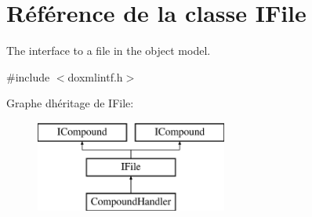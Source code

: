\hypertarget{class_i_file}{}\section{Référence de la classe I\+File}
\label{class_i_file}


The interface to a file in the object model.  




{\ttfamily \#include $<$doxmlintf.\+h$>$}

Graphe d\textquotesingle{}héritage de I\+File\+:\begin{figure}[H]
\begin{center}
\leavevmode
\includegraphics[height=3.000000cm]{class_i_file}
\end{center}
\end{figure}
